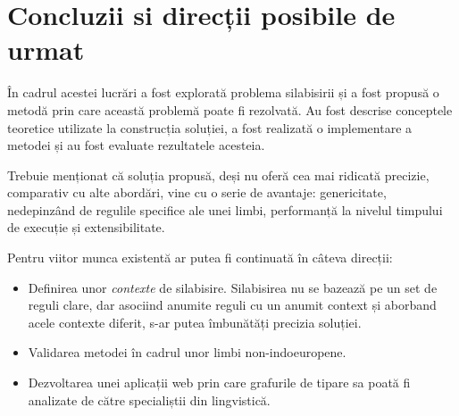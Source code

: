 \chapter{Concluzii si direcții posibile de urmat}
\label{cap:concluzii}

În cadrul acestei lucrări a fost explorată problema silabisirii și a fost propusă o metodă prin care această problemă poate fi rezolvată. Au fost descrise conceptele teoretice utilizate la construcția soluției, a fost realizată o implementare a metodei și au fost evaluate rezultatele acesteia. 

Trebuie menționat că soluția propusă, deși nu oferă cea mai ridicată precizie, comparativ cu alte abordări, vine cu o serie de avantaje: genericitate, nedepinzând de regulile specifice ale unei limbi, performanță la nivelul timpului de execuție și extensibilitate.

Pentru viitor munca existentă ar putea fi continuată în câteva direcții:

\begin{itemize}
\item Definirea unor \textit{contexte} de silabisire. Silabisirea nu se bazează pe un set de reguli clare, dar asociind anumite reguli cu un anumit context și aborband acele contexte diferit, s-ar putea îmbunătăți precizia soluției.

\item Validarea metodei în cadrul unor limbi non-indoeuropene. 

\item Dezvoltarea unei aplicații web prin care grafurile de tipare sa poată fi analizate de către specialiștii din lingvistică. 



\end{itemize}









